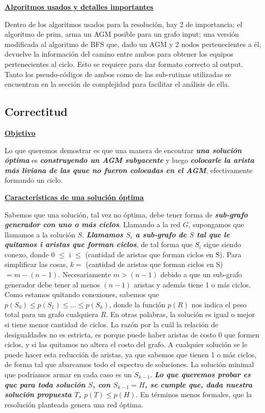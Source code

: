 \noindent \textbf{\underline{Algoritmos usados y detalles importantes}}

Dentro de los algoritmos usados para la resolución, hay 2 de importancia: el algoritmo de prim, arma un AGM posible para un grafo input; una versión modificada al algoritmo de BFS que, dado un AGM y 2 nodos pertenecientes a él, devuelve la información del camino entre ambos para obtener los equipos pertenecientes al ciclo. Esto se requiere para dar formato correcto al output. Tanto los pseudo-códigos de ambos como de las sub-rutinas utilizadas se encuentran en la sección de complejidad para facilitar el análisis de ella.

\newpage
\subsection{Correctitud}

\noindent\textbf{\underline{Objetivo}}

Lo que queremos demostrar es que una manera de encontrar \textbf{\textit{una solución óptima}} es \textbf{\textit{construyendo un AGM subyacente}} y luego \textbf{\textit{colocarle la arista más liviana de las quue no fueron colocadas en el AGM}}, efectivamente formando un ciclo.

\noindent\textbf{\underline{Características de una solución óptima}}

Sabemos que una solución, tal vez no óptima, debe tener forma de \textbf{\textit{sub-grafo generador con uno o más ciclos}}. Llamando a la red $G$, supongamos que llamamos a la solución $S$. \textbf{\textit{Llamamos \boldmath$S_{i}$ a sub-grafo de $S$ tal que le quitamos i aristas que forman ciclos}}, de tal forma que $S_{i}$ sigue siendo conexo, donde 0 $\leq$ i $\leq$ (cantidad de aristas que forman ciclos en S). Para simplificar las cosas, $k =$ (cantidad de aristas que forman ciclos en S) $= m - (n-1)$. Necesariamente $m > (n-1)$ debido a que un sub-grafo generador debe tener al menos $(n-1)$ aristas y además tiene 1 o más ciclos. Como estamos quitando conexiones, sabemos que $p(S_{0})\leq p(S_{1}) \leq ... \leq p(S_{k})$, donde la función $p(R)$ nos indica el peso total para un grafo cualquiera $R$. En otras palabras, la solución es igual o mejor si tiene menor cantidad de ciclos. La razón por la cuál la relación de desigualdades no es estricta, es porque puede haber aristas de costo $0$ que formen ciclos, y si las quitamos no altera el costo del grafo. A cualquier solución se le puede hacer esta reducción de aristas, ya que sabemos que tienen 1 o más ciclos, de forma tal que abarcamos todo el espectro de soluciones. La solución minimal que podríamos armar en cada caso es un $S_{k-1}$. \textbf{\textit{Lo que queremos probar es que para toda solución \boldmath$S$, con \boldmath$S_{k-1} = H$, se cumple que, dada nuestra solución propuesta \boldmath$T$, \boldmath$p(T) \leq p(H)$}}. En términos menos formales, que la resolución planteada genera una red óptima.


